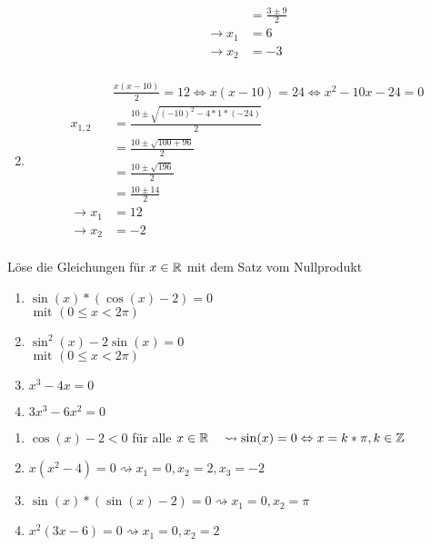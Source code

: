 \begin{lsg}{}
\begin{enumerate}
\begin{align*}
        &=\frac{3\pm9}{2}\\
        \rightarrow x_1&=6\\
        \rightarrow x_2&=-3\\
      \end{align*}
      \item
      \begin{align*}
        &\frac{x(x-10)}{2} = 12 \Leftrightarrow x(x-10)=24 \Leftrightarrow x^2 - 10x - 24 = 0\\
        x_{1,2}&=\frac{10\pm\sqrt{(-10)^2-4*1*(-24)}}{2}\\
        &=\frac{10\pm\sqrt{100+96}}{2}\\
        &=\frac{10\pm\sqrt{196}}{2}\\
        &=\frac{10\pm14}{2}\\
        \rightarrow x_1&=12\\
        \rightarrow x_2&=-2\\
      \end{align*}
    \end{enumerate}
\end{lsg}

 Löse die Gleichungen für $x\in \mathbb{R}$ mit dem Satz vom Nullprodukt
\begin{multicols}{3}
  \begin{enumerate}
		\item $\sin(x)*(\cos(x)-2)=0$\\ $\text{ mit }(0\leq x<2\pi)$\columnbreak
		\item $\sin^2(x)-2\sin(x) = 0$\\ $\text{ mit }(0\leq x<2\pi)$\columnbreak
    \item $x^3 - 4x = 0$
    \item $3x^3-6x^2=0$
  \end{enumerate}
\end{multicols}

\begin{lsg}{}
  \begin{enumerate}
		\item $\cos(x)-2 < 0$ für alle $x\in \mathbb{R} \quad\rightsquigarrow \sin(x)=0 \Leftrightarrow x=k*\pi, k\in\mathbb{Z}$
    \item $x(x^2-4) = 0 \rightsquigarrow x_1=0, x_2=2, x_3=-2$
    \item $\sin(x)*(\sin(x)-2) = 0 \rightsquigarrow x_1=0, x_2=\pi$
    \item $x^2(3x-6)=0 \rightsquigarrow x_1=0, x_2=2$
  \end{enumerate}
\end{lsg}




